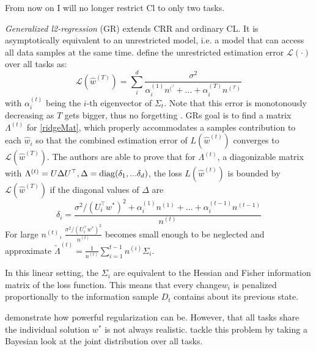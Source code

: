 From now on I will no longer restrict Cl to only two tasks.

\textit{Generalized l2-regression} (GR) \cite{zhao2024statisticaltheoryregularizationbasedcontinual} extends CRR and ordinary CL. It is asymptotically equivalent to an unrestricted model, i.e. a model that can access all data samples at the same time. \citeauthor{zhao2024statisticaltheoryregularizationbasedcontinual} define the unrestricted estimation error $\mathcal{L}(\cdot)$ over all tasks as:
\begin{equation}\label{oracle}
	\mathcal{L}(\hat{w}^{(T)}) = \sum_{i}^{d} \frac{\sigma^2}{\alpha^{(1)}_i n^{(^)}+ ... + \alpha^{(T)}_i n^{(^T)}}
\end{equation}
with $\alpha^{(t)}_i$ being the $i$-th eigenvector of $\Sigma_t$. Note that this error is monotonously decreasing as $T$ gets bigger, thus no forgetting \cite{zhao2024statisticaltheoryregularizationbasedcontinual}. GRs goal is to find a matrix $\Lambda^{(t)}$ for \eqref{ridgeMat}, which properly accommodates a samples contribution to each $\hat{w}_i$ so that the combined estimation error of $L(\hat{w}^{(t)})$ converges to $\mathcal{L}(\hat{w}^{(T)})$. The authors are able to prove that for $\Lambda^{(t)}$, a diagonizable matrix with $\Lambda^{(t)} = U \Delta U^\top, \Delta = \operatorname{diag}(\delta_1, ... \delta_d)$, the loss $L(\hat{w}^{(t)})$ is bounded by $\mathcal{L}(\hat{w}^{(T)})$ if the diagonal values of $\Delta$ are 
\begin{equation}
	\delta_i = \frac{\sigma^2 / (U_i^\top w^*)^2 + \alpha^{(1)}_i n^{(1)} + ... + \alpha^{(t-1)}_i n^{(t-1)}}{n^{(t)}}
\end{equation}
For large $n^{(t)}$, $\frac{\sigma^2 / (U_i^\top w^*)^2}{n^{(t)}}$ becomes small enough to be neglected and \cite{zhao2024statisticaltheoryregularizationbasedcontinual} approximate $\tilde{\Lambda}^{(t)} = \frac{1}{n^{(t)}}\sum_{i = 1}^{t-1} n^{(i)}\Sigma_i$.

In this linear setting, the $\Sigma_i$ are equivalent to the Hessian and Fisher information matrix of the loss function. This means that every change$w_i$ is penalized proportionally to the information sample $D_t$ contains about its previous state.

\citeauthor{zhao2024statisticaltheoryregularizationbasedcontinual} \cite{zhao2024statisticaltheoryregularizationbasedcontinual} demonstrate how powerful regularization can be. However, that all tasks share the individual solution $w^*$ is not always realistic. \citeauthor{JK} \cite{JK} tackle this problem by taking a Bayesian look at the joint distribution over all tasks.

